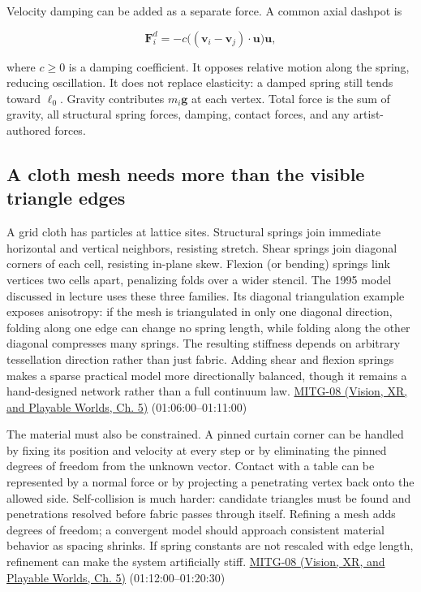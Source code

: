 Velocity damping can be added as a separate force. A common axial dashpot is

\[
\boldsymbol{F}^{d}_i=-c\big((\boldsymbol{v}_i-\boldsymbol{v}_j)\cdot\boldsymbol{u}\big)\boldsymbol{u},
\]

where \(c\ge0\) is a damping coefficient. It opposes relative motion along the spring, reducing oscillation. It does not replace elasticity: a damped spring still tends toward \(\ell_0\). Gravity contributes \(m_i\boldsymbol{g}\) at each vertex. Total force is the sum of gravity, all structural spring forces, damping, contact forces, and any artist-authored forces.

\subsection{A cloth mesh needs more than the visible triangle edges}\label{04-visual-computing-ii-ch029-a-cloth-mesh-needs-more-than-the-visible-triangle-edges}

\hypertarget{04-visual-computing-ii-ch029-a-cloth-mesh-needs-more-than-the-visible-triangle-edges}{}

A grid cloth has particles at lattice sites. Structural springs join immediate horizontal and vertical neighbors, resisting stretch. Shear springs join diagonal corners of each cell, resisting in-plane skew. Flexion (or bending) springs link vertices two cells apart, penalizing folds over a wider stencil. The 1995 model discussed in lecture uses these three families. Its diagonal triangulation example exposes anisotropy: if the mesh is triangulated in only one diagonal direction, folding along one edge can change no spring length, while folding along the other diagonal compresses many springs. The resulting stiffness depends on arbitrary tessellation direction rather than just fabric. Adding shear and flexion springs makes a sparse practical model more directionally balanced, though it remains a hand-designed network rather than a full continuum law. \href{../07-Vision-XR-and-Playable-Worlds/main.pdf\#nameddest=04-visual-computing-ii-ch036-mitg-08---cloth-simulation}{MITG-08 (Vision, XR, and Playable Worlds, Ch. 5)} (01:06:00--01:11:00)

The material must also be constrained. A pinned curtain corner can be handled by fixing its position and velocity at every step or by eliminating the pinned degrees of freedom from the unknown vector. Contact with a table can be represented by a normal force or by projecting a penetrating vertex back onto the allowed side. Self-collision is much harder: candidate triangles must be found and penetrations resolved before fabric passes through itself. Refining a mesh adds degrees of freedom; a convergent model should approach consistent material behavior as spacing shrinks. If spring constants are not rescaled with edge length, refinement can make the system artificially stiff. \href{../07-Vision-XR-and-Playable-Worlds/main.pdf\#nameddest=04-visual-computing-ii-ch036-mitg-08---cloth-simulation}{MITG-08 (Vision, XR, and Playable Worlds, Ch. 5)} (01:12:00--01:20:30)

